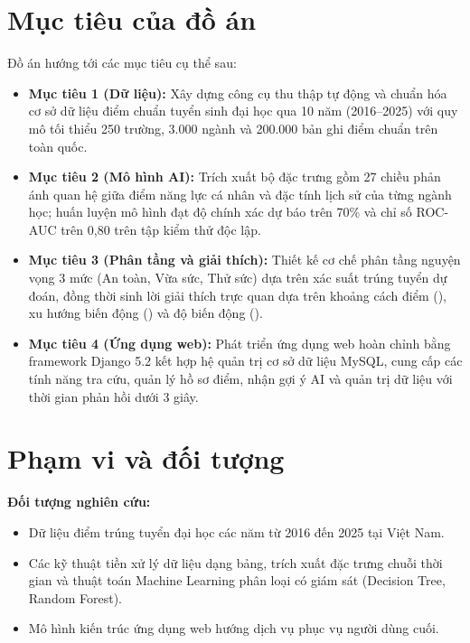 \section{Mục tiêu của đồ án}

Đồ án hướng tới các mục tiêu cụ thể sau:
\begin{itemize}[leftmargin=1.6em, itemsep=2pt]
  \item \textbf{Mục tiêu 1 (Dữ liệu):} Xây dựng công cụ thu thập tự động và chuẩn hóa cơ sở dữ liệu điểm chuẩn tuyển sinh đại học qua 10 năm (2016--2025) với quy mô tối thiểu 250 trường, 3.000 ngành và 200.000 bản ghi điểm chuẩn trên toàn quốc.
  \item \textbf{Mục tiêu 2 (Mô hình AI):} Trích xuất bộ đặc trưng gồm 27 chiều phản ánh quan hệ giữa điểm năng lực cá nhân và đặc tính lịch sử của từng ngành học; huấn luyện mô hình  đạt độ chính xác dự báo trên 70\% và chỉ số ROC-AUC trên 0,80 trên tập kiểm thử độc lập.
  \item \textbf{Mục tiêu 3 (Phân tầng và giải thích):} Thiết kế cơ chế phân tầng nguyện vọng 3 mức (An toàn, Vừa sức, Thử sức) dựa trên xác suất trúng tuyển dự đoán, đồng thời sinh lời giải thích trực quan dựa trên khoảng cách điểm (), xu hướng biến động () và độ biến động ().
  \item \textbf{Mục tiêu 4 (Ứng dụng web):} Phát triển ứng dụng web hoàn chỉnh bằng framework Django 5.2 kết hợp hệ quản trị cơ sở dữ liệu MySQL, cung cấp các tính năng tra cứu, quản lý hồ sơ điểm, nhận gợi ý AI và quản trị dữ liệu với thời gian phản hồi dưới 3 giây.
\end{itemize}

\section{Phạm vi và đối tượng}

\textbf{Đối tượng nghiên cứu:}
\begin{itemize}[leftmargin=1.6em, itemsep=2pt]
  \item Dữ liệu điểm trúng tuyển đại học các năm từ 2016 đến 2025 tại Việt Nam.
  \item Các kỹ thuật tiền xử lý dữ liệu dạng bảng, trích xuất đặc trưng chuỗi thời gian và thuật toán Machine Learning phân loại có giám sát (Decision Tree, Random Forest).
  \item Mô hình kiến trúc ứng dụng web hướng dịch vụ phục vụ người dùng cuối.
\end{itemize}

